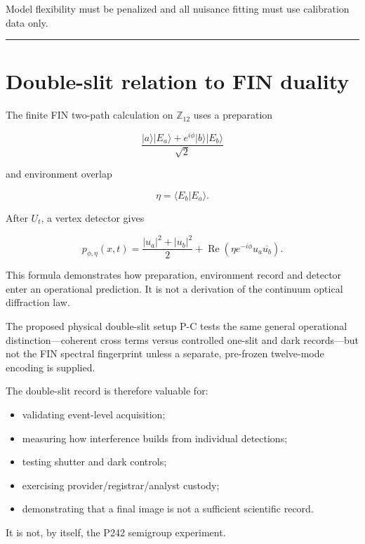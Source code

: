 \documentclass[11pt,a4paper,openany]{report}
\begin{document}
Model flexibility must be penalized and all nuisance fitting must use calibration data only.

\par\medskip\hrule\medskip

\chapter{Double-slit relation to FIN duality}

The finite FIN two-path calculation on \(\mathbb Z_{12}\) uses a preparation

\[
\frac{|a\rangle|E_a\rangle+e^{i\phi}|b\rangle|E_b\rangle}{\sqrt2}
\]

and environment overlap

\[
\eta=\langle E_b|E_a\rangle.
\]

After \(U_t\), a vertex detector gives

\[
p_{\phi,\eta}(x,t)
=
\frac{|u_a|^2+|u_b|^2}{2}
+
\operatorname{Re}
\left(
\eta e^{-i\phi}u_a\overline{u_b}
\right).
\]

This formula demonstrates how preparation, environment record and detector enter an operational prediction. It is not a derivation of the continuum optical diffraction law.

The proposed physical double-slit setup P-C tests the same general operational distinction---coherent cross terms versus controlled one-slit and dark records---but not the FIN spectral fingerprint unless a separate, pre-frozen twelve-mode encoding is supplied.

The double-slit record is therefore valuable for:

\begin{itemize}
\item 
validating event-level acquisition;

\item 
measuring how interference builds from individual detections;

\item 
testing shutter and dark controls;

\item 
exercising provider/\allowbreak{}registrar/\allowbreak{}analyst custody;

\item 
demonstrating that a final image is not a sufficient scientific record.

\end{itemize}

It is not, by itself, the P242 semigroup experiment.
\end{document}
